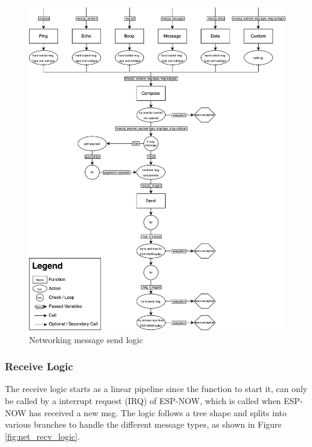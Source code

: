 \begin{figure}[H]
    \centering
    \includegraphics[width=\linewidth]{overleaf/images/send_logic.drawio.png}
    \vspace{\ftspace}
    \caption{Networking message send logic}
    \label{fig:net_send_logic}
\end{figure}

\subsubsection{\label{sec:methods_recv_logic}Receive Logic}

The receive logic starts as a linear pipeline since the function to start it, can only be called by a interrupt request (IRQ) of ESP-NOW, which is called when ESP-NOW has received a new msg. The logic follows a tree shape and splits into various branches to handle the different message types, as shown in Figure \ref{fig:net_recv_logic}. \\

